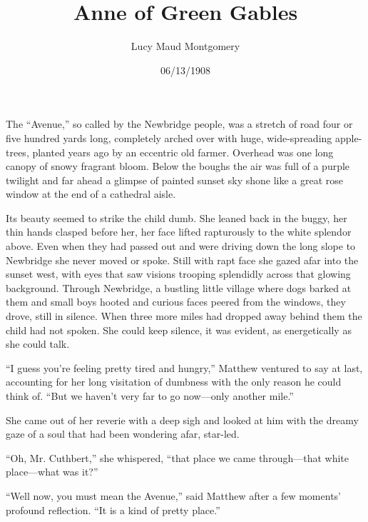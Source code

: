 \documentclass[a4paper]{article}
\title{Anne of Green Gables}
\author{Lucy Maud Montgomery}
\date{06/13/1908}
\begin{document}
\maketitle
The ``Avenue,'' so called by the Newbridge people, was a stretch of road four or five hundred yards long, completely arched over with huge, wide-spreading apple-trees, planted years ago by an eccentric old farmer. Overhead was one long canopy of snowy fragrant bloom. Below the boughs the air was full of a purple twilight and far ahead a glimpse of painted sunset sky shone like a great rose window at the end of a cathedral aisle.



Its beauty seemed to strike the child 
dumb. She leaned back in the buggy, her thin hands clasped before her, her face lifted rapturously to the white splendor above. Even when they had passed out and were driving down the long slope to Newbridge she never moved or spoke. Still with rapt face she gazed afar into the sunset west, with eyes that saw visions trooping splendidly across that glowing background. Through Newbridge, a bustling little village where dogs barked at them and small boys hooted and curious faces peered from the windows, they drove, still in silence. When three more miles had dropped away behind them the child had not spoken. She could keep silence, it was evident, as energetically as she could talk.

                                   ``I guess you're feeling pretty tired and hungry,'' Matthew ventured to say at last, accounting for her long visitation of dumbness with the only reason he could think of. ``But we haven't very far to go now---only another mile.''

She came out of her reverie                            with a deep sigh and looked at him with the dreamy gaze of a soul that had been                     wondering afar, star-led.

``Oh, Mr. Cuthbert,'' she whispered, 
``that place we came through---that white place---what was it?''

``Well now, you must mean the Avenue,'' said Matthew after a few moments' profound reflection. ``It is a kind of pretty place.''
\end{document}
